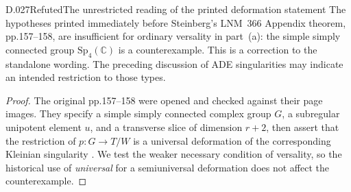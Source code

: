 \begin{saresult}{D.027}{Refuted}{The unrestricted reading of the printed deformation statement}
The hypotheses printed immediately before Steinberg's
LNM~366 Appendix theorem, pp.157--158, are insufficient
for ordinary versality in part~(a): the simple simply
connected group $\mathrm{Sp}_4(\mathbb C)$ is a
counterexample.  This is a correction to the standalone
wording.  The preceding discussion of ADE singularities
may indicate an intended restriction to those types.
\end{saresult}
\begin{proof}
The original pp.157--158 were opened and checked against
their page images.  They specify a simple simply connected
complex group $G$, a subregular unipotent element $u$,
and a transverse slice of dimension $r+2$, then assert
that the restriction of
$p:G\longrightarrow T/W$ is a universal deformation
of the corresponding Kleinian singularity
\cite[Appendix, pp.157--158]{D-Steinberg1974}.
We test the weaker necessary condition of versality, so
the historical use of \emph{universal} for a semiuniversal
deformation does not affect the counterexample.


\end{proof}
